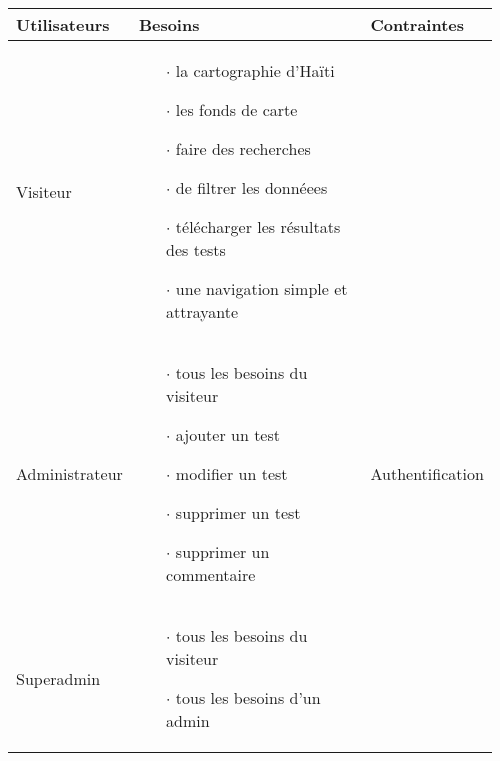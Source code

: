\par    
\begin{table}
        \centering
        \begin{tabular}{|p{0.21\linewidth}|p{0.54\linewidth}|p{0.21\linewidth}|}
        \hline
                \textbf{Utilisateurs} & \textbf{Besoins} & 
                \textbf{Contraintes}  \\
                \hline
                        Visiteur & 
                        \begin{itemize}
                                 \item[$\cdot$]  la cartographie d'Haïti
                                 \item[$\cdot$]  les fonds de carte
                                 \item[$\cdot$]  faire des recherches
                                 \item[$\cdot$]  de filtrer les donnéees
                                 \item[$\cdot$]  télécharger les résultats des tests
                                 \item[$\cdot$]  une navigation simple et attrayante
                        \end{itemize} & 
                         \\
                \hline
                        Administrateur & 
                        \begin{itemize}
                                \item[$\cdot$]  tous les besoins du visiteur
                                \item[$\cdot$]  ajouter un test
                                \item[$\cdot$]  modifier un test
                                \item[$\cdot$]  supprimer un test
                                \item[$\cdot$]  supprimer un commentaire
                        \end{itemize} & 
                        Authentification \\
                \hline
                        Superadmin & 
                        \begin{itemize}
                                \item[$\cdot$]  tous les besoins du visiteur
                                \item[$\cdot$]  tous les besoins d'un admin

\end{itemize}
\end{tabular}
\end{table}
